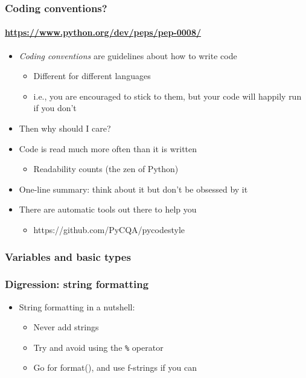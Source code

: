 \documentclass[9pt]{beamer}
\begin{document}
\begin{frame}
  \frametitle{Coding conventions?}
  \framesubtitle{\url{https://www.python.org/dev/peps/pep-0008/}}
  \begin{itemize}
  \item \emph{Coding conventions} are guidelines about how to write code
    \begin{itemize}
    \item Different for different languages
    \item i.e., you are encouraged to stick to them, but your code will
      happily run if you don't
    \end{itemize}
  \item \alert{Then why should I care?}
  \item Code is read much more often than it is written
    \begin{itemize}
    \item Readability counts (the zen of Python)
    \end{itemize}
  \item One-line summary: \alert{think about it but don't be obsessed by it}
  \item There are automatic tools out there to help you
    \begin{itemize}
    \item https://github.com/PyCQA/pycodestyle
    \end{itemize}
  \end{itemize}
\end{frame}


\begin{frame}
  \frametitle{Variables and basic types}
  
\end{frame}


\begin{frame}
  \frametitle{Digression: string formatting}
  
  \begin{itemize}
  \item String formatting in a nutshell:
    \begin{itemize}
    \item Never add strings
    \item Try and avoid using the \texttt{\%} operator
    \item Go for format(), and use f-strings if you can
    \end{itemize}
  \end{itemize}
\end{frame}
\end{document}
